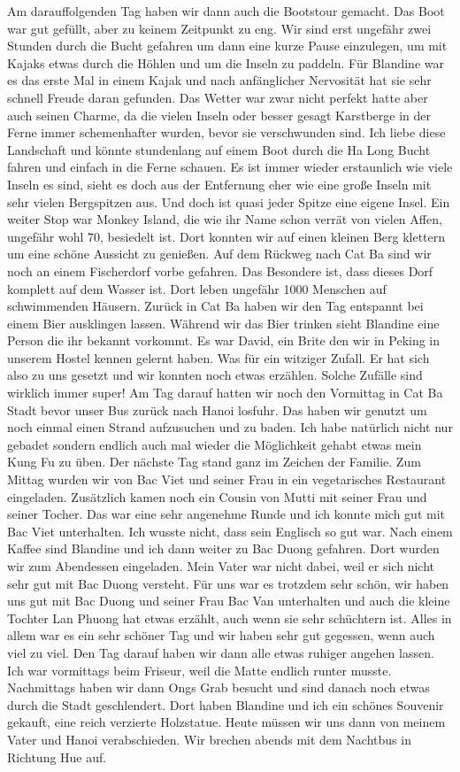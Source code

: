 \documentclass[11pt]{book}
\begin{document}
Am darauffolgenden Tag haben wir dann auch die Bootstour gemacht. Das Boot war gut gefüllt, aber zu keinem Zeitpunkt 
zu eng. Wir sind erst ungefähr zwei Stunden durch die Bucht gefahren um dann eine kurze Pause einzulegen, um mit 
Kajaks etwas durch die Höhlen und um die Inseln zu paddeln. Für Blandine war es das erste Mal in einem Kajak und nach
anfänglicher Nervosität hat sie sehr schnell Freude daran gefunden. Das Wetter war zwar nicht perfekt hatte aber 
auch seinen Charme, da die vielen Inseln oder besser gesagt Karstberge in der Ferne immer schemenhafter wurden, 
bevor sie verschwunden sind. Ich liebe diese Landschaft und könnte stundenlang auf einem Boot durch die Ha Long 
Bucht fahren und einfach in die Ferne schauen. Es ist immer wieder erstaunlich wie viele Inseln es sind, sieht es 
doch aus der Entfernung eher wie eine große Inseln mit sehr vielen Bergspitzen aus. Und doch ist quasi jeder Spitze 
eine eigene Insel. Ein weiter Stop war Monkey Island, die wie ihr Name schon verrät von vielen Affen, ungefähr wohl 
70, besiedelt ist. Dort konnten wir auf einen kleinen Berg klettern um eine schöne Aussicht zu genießen. Auf dem Rückweg
nach Cat Ba sind wir noch an einem Fischerdorf vorbe gefahren. Das Besondere ist, dass dieses Dorf komplett auf dem 
Wasser ist. Dort leben ungefähr 1000 Menschen auf schwimmenden Häusern. Zurück in Cat Ba haben wir den Tag entspannt 
bei einem Bier ausklingen lassen. Während wir das Bier trinken sieht Blandine eine Person die ihr bekannt vorkommt.
Es war David, ein Brite den wir in Peking in unserem Hostel kennen gelernt haben. Was für ein witziger Zufall. Er 
hat sich also zu uns gesetzt und wir konnten noch etwas erzählen. Solche Zufälle sind wirklich immer super! 
Am Tag darauf hatten wir noch den Vormittag in Cat Ba Stadt bevor unser Bus zurück nach Hanoi losfuhr. Das haben 
wir genutzt um noch einmal einen Strand aufzusuchen und zu baden. Ich habe natürlich nicht nur gebadet sondern endlich 
auch mal wieder die Möglichkeit gehabt etwas mein Kung Fu zu üben.
Der nächste Tag stand ganz im Zeichen der Familie. Zum Mittag wurden wir von Bac Viet und seiner Frau in ein vegetarisches 
Restaurant eingeladen. Zusätzlich kamen noch ein Cousin von Mutti mit seiner Frau und seiner Tocher. Das war eine sehr
angenehme Runde und ich konnte mich gut mit Bac Viet unterhalten. Ich wusste nicht, dass sein Englisch so gut war. 
Nach einem Kaffee sind Blandine und ich dann weiter zu Bac Duong gefahren. Dort wurden wir zum Abendessen eingeladen.
Mein Vater war nicht dabei, weil er sich nicht sehr gut mit Bac Duong versteht. Für uns war es trotzdem sehr schön, 
wir haben uns gut mit Bac Duong und seiner Frau Bac Van unterhalten und auch die kleine Tochter Lan Phuong hat etwas
erzählt, auch wenn sie sehr schüchtern ist. Alles in allem war es ein sehr schöner Tag und wir haben sehr gut gegessen,
wenn auch viel zu viel. Den Tag darauf haben wir dann alle etwas ruhiger angehen lassen. Ich war vormittags beim 
Friseur, weil die Matte endlich runter musste. Nachmittags haben wir dann Ongs Grab besucht und sind danach noch etwas 
durch die Stadt geschlendert. Dort haben Blandine und ich ein schönes Souvenir gekauft, eine reich verzierte Holzstatue.
Heute müssen wir uns dann von meinem Vater und Hanoi verabschieden. Wir brechen abends mit dem Nachtbus in Richtung 
Hue auf.
\end{document}
